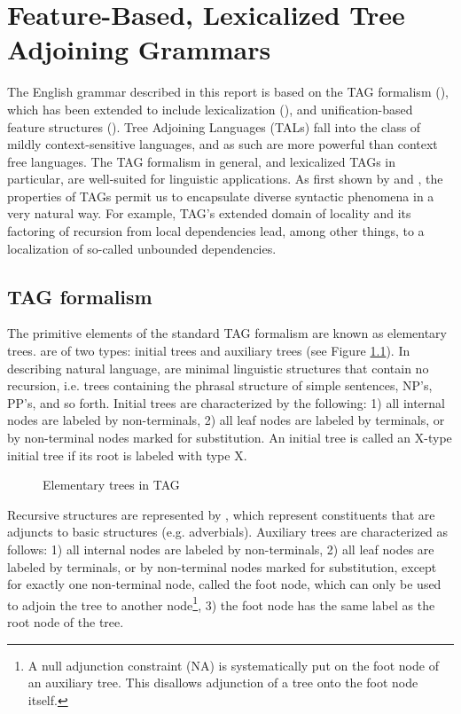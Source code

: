 \chapter{Feature-Based, Lexicalized Tree Adjoining Grammars}
\label{intro-FBLTAG}

The English grammar described in this report is based on the TAG formalism
(\cite{joshi75}), which has been extended to include lexicalization
(\cite{schabes88}), and unification-based feature structures
(\cite{vijay91}). Tree Adjoining Languages (TALs) fall into the class of mildly
context-sensitive languages, and as such are more powerful than context free
languages.  The TAG formalism in general, and lexicalized TAGs in particular,
are well-suited for linguistic applications.  As first shown by \cite{joshi85}
and \cite{kj87}, the properties of TAGs permit us to encapsulate diverse
syntactic phenomena in a very natural way.  For example, TAG's extended domain
of locality and its factoring of recursion from local dependencies lead, among
other things, to a localization of so-called unbounded dependencies.

\section{TAG formalism}

The primitive elements of the standard TAG formalism are known as elementary
trees.   are of two types: initial trees and
auxiliary trees (see Figure \ref{elem-fig}).  In describing natural language,
 are minimal linguistic structures that contain no
recursion, i.e. trees containing the phrasal structure of simple sentences,
NP's, PP's, and so forth.  Initial trees are characterized by the following: 1)
all internal nodes are labeled by non-terminals, 2) all leaf nodes are labeled
by terminals, or by non-terminal nodes marked for substitution. An initial tree
is called an X-type initial tree if its root is labeled with type X.

\begin{figure}[htb]
\centering
{}
\caption{Elementary trees in TAG}
\label{elem-fig}
\end{figure}

Recursive structures are represented by , which
represent constituents that are adjuncts to basic structures (e.g. adverbials).
Auxiliary trees are characterized as follows: 1) all internal nodes are labeled
by non-terminals, 2) all leaf nodes are labeled by terminals, or by
non-terminal nodes marked for substitution, except for exactly one non-terminal
node, called the foot node, which can only be used to adjoin the tree to
another node\footnote{A null adjunction constraint (NA) is systematically put
on the foot node of an auxiliary tree. This disallows adjunction of a tree onto
the foot node itself.}, 3) the foot node has the same label as the root node of
the tree.

